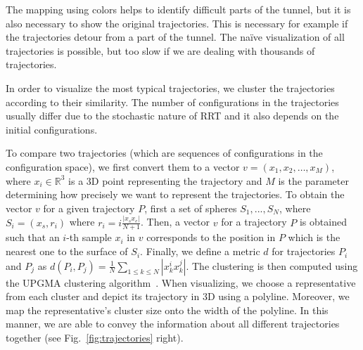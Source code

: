 \documentclass{svmult}
\def\R{\mathbb{R}}
\begin{document}
The mapping using colors helps to identify difficult parts of the tunnel, but it is also necessary to show the original trajectories.
This is necessary for example if the trajectories detour from a part of the tunnel.
The na\"{i}ve visualization of all trajectories is possible, but too slow if we are dealing with thousands of trajectories.

In order to visualize the most typical trajectories, we cluster the trajectories according to their similarity.
The number of configurations in the trajectories usually differ due to the stochastic nature of RRT and it also depends on the
initial configurations.

To compare two trajectories (which are sequences of configurations in the configuration space), we first convert them
to a vector $v=(x_1,x_2,\ldots,x_M)$, where $x_i \in \R^3$ is a 3D
point representing the trajectory and $M$ is the parameter determining how precisely we want to represent the trajectories.
To obtain the vector $v$ for a given trajectory $P$, first a set of spheres 
 $S_1, ..., S_N$, where $S_i = (x_s, r_i)$ where $r_i = i \frac{|x_s x_e|}{N + 1}$.
Then, a vector $v$ for a trajectory $P$ is obtained such that an $i$-th sample $x_i$ in $v$ corresponds to the position in $P$ which is the nearest one to the surface of $S_i$.
Finally, we define a metric $d$ for trajectories $P_i$ and $P_j$ as $d(P_i, P_j) = \frac{1}{N} \sum_{1 \leq k \leq N} |x_k^i x_k^j|$.
The clustering is then computed using the UPGMA clustering algorithm~\cite{sokal1958statistical}.
When visualizing, we choose a representative from each cluster and depict its trajectory in 3D using a polyline.
Moreover, we map the representative's cluster size onto the width of the polyline.
In this manner, we are able to convey the information about all different trajectories together (see Fig.~\ref{fig:trajectories} right).
\end{document}
